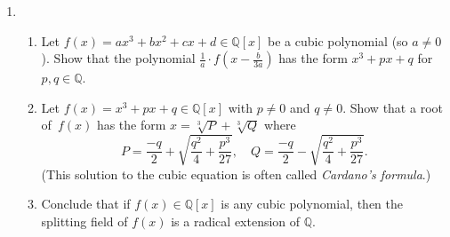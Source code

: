 \documentclass[11pt]{article}
\begin{document}
\begin{enumerate}
\item \begin{enumerate}
\item Let $f(x) = ax^3+bx^2+cx+d \in \mathbb{Q}[x]$ be a cubic polynomial (so $a \neq 0$). Show that the polynomial $\frac{1}{a} \cdot f(x-\frac{b}{3a})$ has the form $x^3+px+q$ for $p,q\in \mathbb{Q}$.
\item Let $f(x) = x^3+px+q\in \mathbb{Q}[x]$ with $p\neq 0$ and $q\neq 0$. Show that a root of~$f(x)$ has the form $x=\sqrt[3]{P}+\sqrt[3]{Q}$ where 
\[ P = \frac{-q}{2} + \sqrt{\frac{q^2}{4}+\frac{p^3}{27}}, \quad Q = \frac{-q}{2} - \sqrt{\frac{q^2}{4}+\frac{p^3}{27}}.\]
(This solution to the cubic equation is often called \emph{Cardano's formula}.)
\item Conclude that if $f(x) \in \mathbb{Q}[x]$ is any cubic polynomial, then the splitting field of $f(x)$ is a radical extension of $\mathbb{Q}$.
\end{enumerate}

\end{enumerate}
\end{document}
